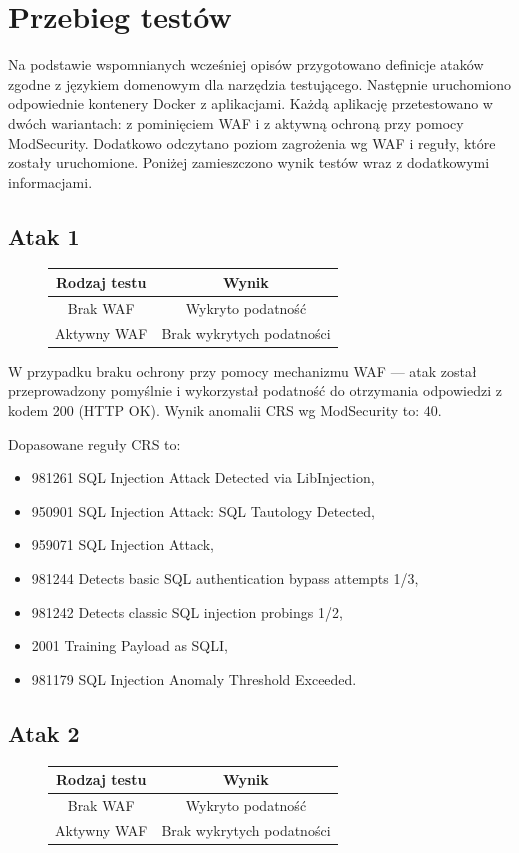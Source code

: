 \documentclass[11pt,a4paper,polish,thesis]{dcsbook}
\begin{document}
\section{Przebieg testów}
Na podstawie wspomnianych wcześniej opisów przygotowano definicje ataków zgodne z językiem domenowym dla narzędzia testującego. Następnie uruchomiono odpowiednie kontenery Docker z aplikacjami. Każdą aplikację przetestowano w dwóch wariantach: z pominięciem WAF i z aktywną ochroną przy pomocy ModSecurity. Dodatkowo odczytano poziom zagrożenia wg WAF i reguły, które zostały uruchomione. Poniżej zamieszczono wynik testów wraz z dodatkowymi informacjami.
\FloatBarrier
\subsection*{Atak 1}

\begin{figure}[!htbp]
\centering
\begin{tabular}{|c|c|}
\hline 
\textbf{Rodzaj testu} & \textbf{Wynik} \\ 
\hline 
Brak WAF & Wykryto podatność \\ 
\hline 
Aktywny WAF & Brak wykrytych podatności \\ 
\hline 
\end{tabular} 

\end{figure}
\FloatBarrier

W przypadku braku ochrony przy pomocy mechanizmu WAF --- atak został przeprowadzony pomyślnie i wykorzystał podatność do otrzymania odpowiedzi z kodem 200 (HTTP OK). Wynik anomalii CRS wg ModSecurity to: $40$.

Dopasowane reguły CRS to:
\begin{itemize}
\item 981261 SQL Injection Attack Detected via LibInjection,
\item 950901 SQL Injection Attack: SQL Tautology Detected,
\item 959071 SQL Injection Attack,
\item 981244 Detects basic SQL authentication bypass attempts 1/3,
\item 981242 Detects classic SQL injection probings 1/2,
\item 2001 Training Payload as SQLI,
\item 981179 SQL Injection Anomaly Threshold Exceeded.
\end{itemize}

\subsection*{Atak 2}
\FloatBarrier
\begin{figure}[!htbp]
\centering
\begin{tabular}{|c|c|}
\hline 
\textbf{Rodzaj testu} & \textbf{Wynik} \\ 
\hline 
Brak WAF & Wykryto podatność \\ 
\hline 
Aktywny WAF & Brak wykrytych podatności \\ 
\hline 
\end{tabular} 
\end{figure}
\end{document}
